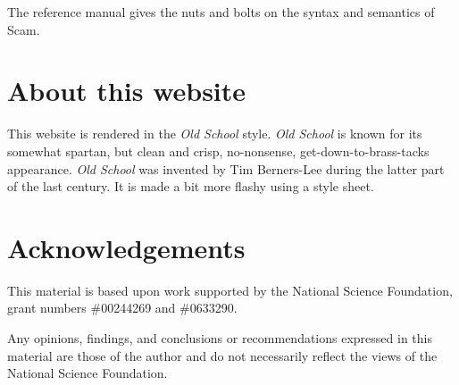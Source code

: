 \documentclass{article}
\begin{document}
The reference manual gives the nuts and bolts on the syntax
and semantics of Scam.

\section*{About this website}
This website is rendered in the \emph{Old School} style.
\emph{Old School} is known for its somewhat spartan,
but clean and crisp, no-nonsense, get-down-to-brass-tacks
appearance. \emph{Old School} was invented by
Tim Berners-Lee during the latter part of the last 
century. It is made a bit more flashy using a
style sheet.

\section*{Acknowledgements}

This material is based upon work supported by the
National Science Foundation, grant numbers \#00244269 and \#0633290.

Any opinions, findings, and conclusions or recommendations
expressed in this material are those of the author and
do not necessarily reflect the views of the National Science Foundation.
\end{document}
